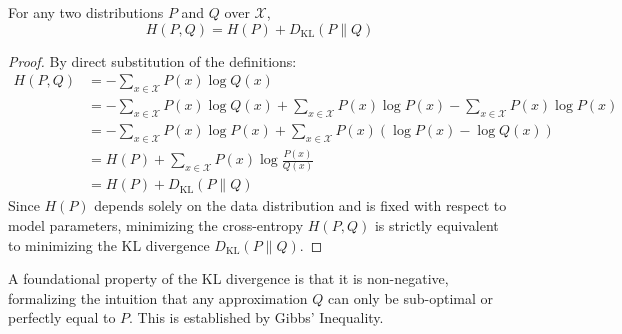 \begin{theorem}
For any two distributions $P$ and $Q$ over $\mathcal{X}$,
\begin{equation}
H(P, Q) = H(P) + D_{\text{KL}}(P \parallel Q)
\end{equation}
\end{theorem}
\begin{proof}
By direct substitution of the definitions:
\begin{align*}
H(P, Q) &= -\sum_{x \in \mathcal{X}} P(x) \log Q(x) \\
&= -\sum_{x \in \mathcal{X}} P(x) \log Q(x) + \sum_{x \in \mathcal{X}} P(x) \log P(x) - \sum_{x \in \mathcal{X}} P(x) \log P(x) \\
&= -\sum_{x \in \mathcal{X}} P(x) \log P(x) + \sum_{x \in \mathcal{X}} P(x) \left( \log P(x) - \log Q(x) \right) \\
&= H(P) + \sum_{x \in \mathcal{X}} P(x) \log \frac{P(x)}{Q(x)} \\
&= H(P) + D_{\text{KL}}(P \parallel Q)
\end{align*}
Since $H(P)$ depends solely on the data distribution and is fixed with respect to model parameters, minimizing the cross-entropy $H(P, Q)$ is strictly equivalent to minimizing the KL divergence $D_{\text{KL}}(P \parallel Q)$.
\end{proof}

A foundational property of the KL divergence is that it is non-negative, formalizing the intuition that any approximation $Q$ can only be sub-optimal or perfectly equal to $P$. This is established by Gibbs' Inequality.

